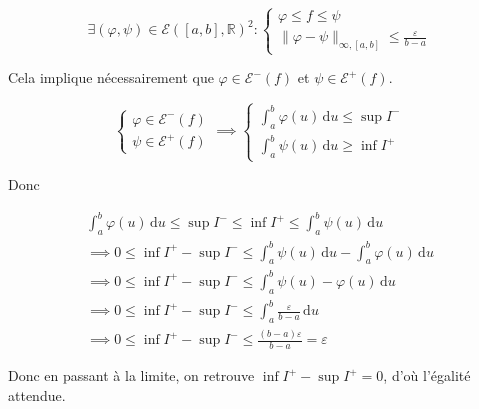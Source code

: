 \documentclass{article}
\begin{document}
\begin{question_kholle}
\begin{itemize}[label=$\lozenge$]
		      $$
			      \exists (\varphi, \psi) \in \mathcal{E}([a, b], \mathbb{R})^{2} : \left\{ \begin{array}{ll}
				      \varphi \leqslant f \leqslant \psi \\
				      \|\varphi - \psi\| _{\infty, [a, b]} \leqslant \frac{\varepsilon}{b-a}
			      \end{array}\right.
		      $$

		      Cela implique nécessairement que $\varphi \in \mathcal{E}^{-}(f)$ et $\psi \in \mathcal{E}^{+}(f)$.

		      $$
			      \left\{ \begin{array}{ll}
				      \varphi \in \mathcal{E}^{-}(f) \\
				      \psi \in \mathcal{E}^{+}(f)
			      \end{array}\right. \implies \left\{ \begin{array}{ll}
				      \int_{a}^{b} \varphi (u) \, \mathrm du \leqslant \sup I^{-} \\
				      \int_{a}^{b} \psi(u) \, \mathrm du \geqslant \inf I^{+}
			      \end{array}\right.
		      $$

		      Donc

		      \begin{align*}
			      \int_{a}^{b} \varphi(u) \, \mathrm du  \leqslant \sup I^{-} \leqslant \inf I^{+} \leqslant \int_{a}^{b} \psi(u) \, \mathrm du     \\
			      \implies 0 \leqslant \inf I^{+} - \sup I^{-} \leqslant \int_{a}^{b} \psi(u) \, \mathrm du - \int_{a}^{b} \varphi(u) \, \mathrm du \\
			      \implies 0 \leqslant \inf I^{+} - \sup I^{-} \leqslant \int_{a}^{b} \psi(u) - \varphi(u) \, \mathrm du                            \\
			      \implies 0 \leqslant \inf I^{+} - \sup I^{-} \leqslant \int_{a}^{b} \frac{\varepsilon}{b-a} \, \mathrm du                         \\
			      \implies 0 \leqslant \inf I^{+} - \sup I^{-} \leqslant \frac{(b-a)\varepsilon}{b-a} = \varepsilon
		      \end{align*}


		      Donc en passant à la limite, on retrouve $\inf I^{+} - \sup I^{+} = 0$, d'où l'égalité attendue.
	\end{itemize}
\end{question_kholle}
\end{document}
